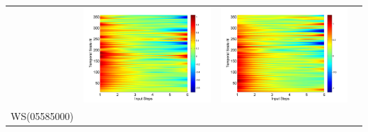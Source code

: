 \documentclass[draft,wrr]{AGUTeX}
\begin{document}
\begin{article}
\begin{table}[H]
\begin{tabular}{cccc}
&\begin{minipage}{.3\textwidth}\includegraphics[width=\linewidth]{resultgraph/02143000epdiff_former.png}\end{minipage}
&\begin{minipage}{.3\textwidth}\includegraphics[width=\linewidth]{resultgraph/02143000qdiff_former.png}\end{minipage}
\\
WS(05585000)

\end{tabular}
\end{table}
\end{article}
\end{document}
